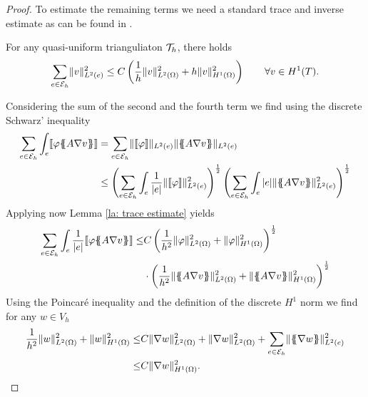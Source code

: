 \begin{proof}
To estimate the remaining terms we need a standard trace and inverse estimate as can be found in \cite[Section 4.5]{BS2002}.
\begin{lemma}\label{la: trace estimate}
	For any quasi-uniform trianguliaton $\mathcal{T}_h$, there holds
	\[
	\sum_{e \in \mathcal{E}_h} \lVert v \rVert_{L^2(e)}^2 \leq C\left(\frac 1 {h} \lVert v \rVert_{L^2(\Omega)}^2  + h \lVert v \rVert_{H^1(\Omega)}^2\right) \qquad \forall v \in H^1(T).
	\]
\end{lemma}
Considering the sum of the second and the fourth term we find using the discrete Schwarz' inequality
\begin{align}
	\sum\limits_{e \in \edges}\int_{e} \jump {\varphi \average{A \nabla v} } &=
	\sum\limits_{e \in \edges}  \LTwonormE{\jump {\varphi}} \LTwonormE {\average{A \nabla v}} \nonumber \\
	& \leq
		\left( \sum\limits_{e \in \edges}\int_{e} \frac 1 {|e|}\LTwonormE{\jump {\varphi}}^2 \right)^{\frac 1 2}
		\left( \sum\limits_{e \in \edges}\int_{e} |e|\LTwonormE{\average{A \nabla v}}^2 \right)^{\frac 1 2}
\end{align}	
Applying now Lemma \ref{la: trace estimate} yields
\begin{align}
	\sum\limits_{e \in \edges}\int_{e} \frac 1 {|e|} \jump{\varphi \average{A \nabla v} } 
	\leq&
		C \left( \frac 1 {h^2}\LTwonorm{ {\varphi}}^2 
		+ \HOnenorm{ {\varphi}}^2 \right)^{\frac 1 2} \nonumber \\
		&\cdot \left( \frac 1 {h^2}\LTwonorm{\average{A \nabla v}}^2 
		+ \HOnenorm{\average{A \nabla v}}^2 \right)^{\frac 1 2} 
	\end{align}
Using the Poincar\'e inequality and the definition of the discrete $H^1$ norm we find for any $w \in V_h$
\begin{align}
\frac 1 {h^2}\lVert  {w} \rVert_{L^2(\Omega)}^2 + \lVert  {w} \rVert_{H^1(\Omega)}^2 
\leq& C \lVert  {\nabla w} \rVert_{L^2(\Omega)}^2 + \lVert  {\nabla w} \rVert_{L^2(\Omega)}^2 +\sum_{e \in \mathcal{E}_h} \lVert  {\ensuremath{\{\!\!\{ \nabla w \}\!\!\}}} \rVert_{L^2(e)}^2 \nonumber\\
\leq& C \lVert  {\nabla w} \rVert_{H^1(\Omega)}^2.
\end{align}

\end{proof}

